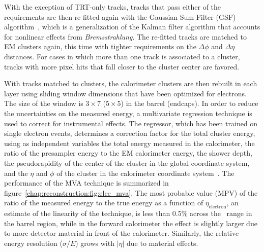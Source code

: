 With the exception of TRT-only tracks, tracks that pass either of the requirements are then re-fitted again
with the Gaussian Sum Filter (GSF)
algorithm~\cite{bib:ATLAS-CONF-2012-047}, which is a generalization of
the Kalman filter algorithm that accounts for nonlinear effects from
{\it Bremsstrahlung}. The re-fitted
tracks are matched to EM clusters again, this time with tighter
requirements on the $\Delta{\phi}$ and $\Delta{\eta}$ distances. For
cases in which more than one track is associated to a cluster, tracks
with more pixel hits that fall closer to the cluster center are
favored. 

With tracks matched to clusters, the calorimeter clusters are then
rebuilt in each layer using sliding window dimensions that have been
optimized for electrons. The size of the window is $3 \times 7$ ($5
\times 5$) in the barrel (endcaps). In order to reduce the
uncertainties on the measured energy, a multivariate regression
technique is used to correct for instrumental effects. The regressor,
which has been trained on single electron events, determines a
correction factor for the total cluster energy, using as independent
variables the total energy measured in the calorimeter, the ratio of
the presampler energy to the EM calorimeter energy, the shower depth,
the pseudorapidity of the center of the cluster in the global
coordinate system, and the $\eta$ and $\phi$ of the cluster in the
calorimeter coordinate system~\cite{bib:Aad:2014nim}. The performance
of the MVA technique is summarized in
figure~\ref{chap:reconstruction:fig:elec_mva}. The most
probable value (MPV) of the ratio of the measured energy to the true
energy as a function of $\eta_{\textrm{electron}}$, an
estimate of the linearity of the technique, is less than 0.5\% across
the \et~range in the barrel region, while in the forward calorimeter
the effect is slightly larger due to more detector material in front
of the calorimeter. Similarly, the relative energy resolution ($\sigma/E$) grows
with $|\eta|$ due to material effects. 

